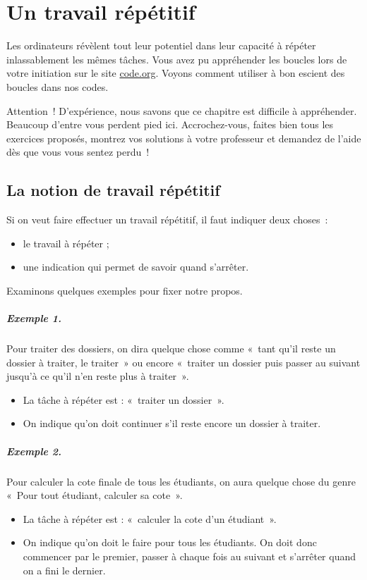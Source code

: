 \chapter{Un travail répétitif}
\label{chap:bcl}

	Les ordinateurs révèlent tout leur potentiel dans leur capacité à
	répéter inlassablement les mêmes tâches.
	Vous avez pu appréhender les boucles lors de votre initiation
	sur le site \url{code.org}.
	Voyons comment utiliser à bon escient des boucles dans nos codes.

	Attention~! 
	D’expérience, nous savons que ce chapitre est difficile à appréhender. 
	Beaucoup d’entre vous perdent pied ici. 
	Accrochez-vous, faites bien tous les exercices proposés,
	montrez vos solutions à votre professeur
	et demandez de l'aide dès que vous vous sentez perdu~!

\section{La notion de travail répétitif}

	Si on veut faire effectuer un travail répétitif, 
	il faut indiquer deux choses~:
	\begin{itemize}
	\item le travail à répéter ;
	\item une indication qui permet de savoir quand s'arrêter.
	\end{itemize}

	Examinons quelques exemples pour fixer notre propos.

	\paragraph{Exemple 1.} 
	Pour traiter des dossiers, 
	on dira quelque chose comme 
	«~tant qu’il reste un dossier à traiter, le traiter~» 
	ou encore 
	«~traiter un dossier puis passer au suivant jusqu’à ce qu’il n’en reste plus à traiter~».
	\begin{itemize}
	\item La tâche à répéter est : «~traiter un dossier~».
	\item On indique qu’on doit continuer s’il reste encore un dossier à traiter.
	\end{itemize}

	\paragraph{Exemple 2.}
	Pour calculer la cote finale de tous les étudiants,
	on aura quelque chose du genre 
	«~Pour tout étudiant, calculer sa cote~».
	\begin{itemize}
	\item 
		La tâche à répéter est : «~calculer la cote d’un étudiant~».
	\item 
		On indique qu’on doit le faire pour tous les étudiants.
		On doit donc commencer par le premier, passer à chaque fois au suivant
		et s’arrêter quand on a fini le dernier.
	\end{itemize}

